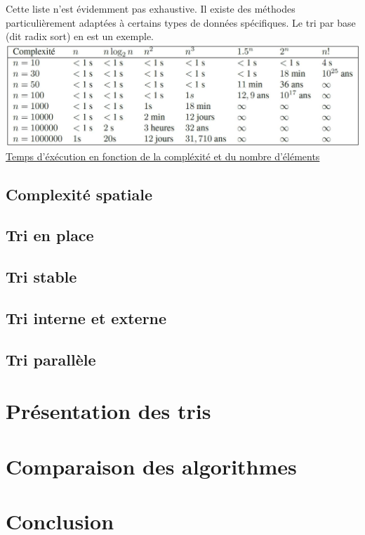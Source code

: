 \documentclass[11pt,a4paper]{article}
\begin{document}
\begin{itemize}
          Cette liste n’est évidemment pas exhaustive. Il existe des méthodes particulièrement adaptées à certains types de données spécifiques. Le tri par base (dit radix sort) en est un exemple.
          \newline
          \newline
          \includegraphics[scale = 0.5]{O(n).jpg}
          \underline {Temps d'éxécution en fonction de la compléxité et du nombre d'éléments}


\end{itemize}

\subsection{Complexité spatiale}

\subsection{Tri en place}

\subsection{Tri stable}

\subsection{Tri interne et externe}

\subsection{Tri parallèle}

\section{Présentation des tris}

\section{Comparaison des algorithmes}

\section{Conclusion}
\end{document}
